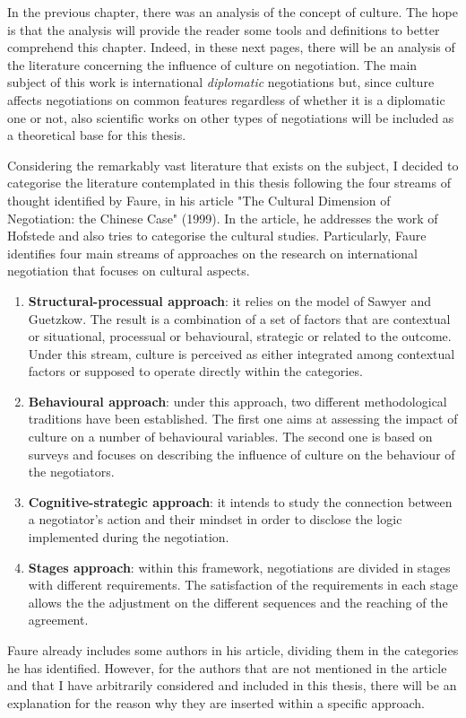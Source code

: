 \documentclass[../main.tex]{subfiles}
\begin{document}
In the previous chapter, there was an analysis of the concept of culture. The hope is that the analysis will provide the reader some tools and definitions to better comprehend this chapter. Indeed, in these next pages, there will be an analysis of the literature concerning the influence of culture on negotiation. The main subject of this work is international \textit{diplomatic} negotiations but, since culture affects negotiations on common features regardless of whether it is a diplomatic one or not, also scientific works on other types of negotiations will be included as a theoretical base for this thesis.%

Considering the remarkably vast literature that exists on the subject, I decided to categorise the literature contemplated %
in this thesis following the four streams of thought identified by Faure, in his article "The Cultural Dimension of Negotiation: the Chinese Case" (1999). In the article, he addresses the work of Hofstede and also tries to categorise the cultural studies. Particularly, Faure identifies four main streams of approaches on the research on international negotiation that focuses on cultural aspects.
\begin{enumerate}
\item \textbf{Structural-processual approach}: it relies on the model of Sawyer and Guetzkow. The result is a combination of a set of factors that are contextual or situational, processual or behavioural, strategic or related to the outcome. Under this stream, culture is perceived as either integrated among contextual factors or supposed to operate directly within the categories.
\item \textbf{Behavioural approach}: under this approach, two different methodological traditions have been established. The first one aims at assessing the impact of culture on a number of behavioural variables. The second one is based on surveys and focuses on describing the influence of culture on the behaviour of the negotiators.
\item \textbf{Cognitive-strategic approach}: it intends to study the connection between a negotiator's action and their mindset in order to disclose the logic implemented during the negotiation.
\item \textbf{Stages approach}: within this framework, negotiations are divided in stages with different requirements. The satisfaction of the requirements in each stage allows the the adjustment on the different sequences and the reaching of the agreement.
\end{enumerate} %

Faure already includes some authors in his article, dividing them in the categories he has identified. However, for the authors that are not mentioned in the article and that I have arbitrarily considered and included in this thesis, there will be an explanation for the reason why they are inserted within a specific approach.
\end{document}

